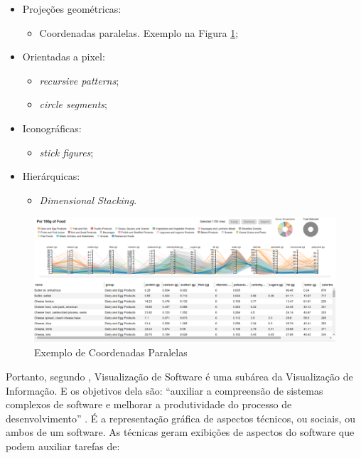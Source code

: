 \begin{itemize}
  \item Projeções geométricas:
	\begin{itemize}
		\item Coordenadas paralelas. Exemplo na Figura \ref{fig:parallel};
	\end{itemize}
  \item Orientadas a pixel:
	\begin{itemize}
		\item \textit{recursive patterns};
		\item \textit{circle segments};
	\end{itemize}
  \item Iconográficas:
	\begin{itemize}
		\item \textit{stick figures};
	\end{itemize}
  \item Hierárquicas:
	\begin{itemize}
		\item \textit{Dimensional Stacking}.
	\end{itemize}
\end{itemize}

\begin{figure}[!htb]
  \centering
    \includegraphics[keepaspectratio=true,scale=0.3]
    {figuras/parallel.eps}
  \caption{Exemplo de Coordenadas Paralelas \cite{kaichang2015}}
  \label{fig:parallel}
\end{figure}

Portanto, segundo , Visualização de Software
é uma subárea da Visualização de Informação. E os objetivos dela são: ``auxiliar
a compreensão de sistemas complexos de software e melhorar a produtividade do
processo de desenvolvimento'' \cite{messias2012}. É a representação gráfica de
aspectos técnicos, ou sociais, ou ambos de um software. As técnicas geram
exibições de aspectos do software que podem auxiliar tarefas de:

